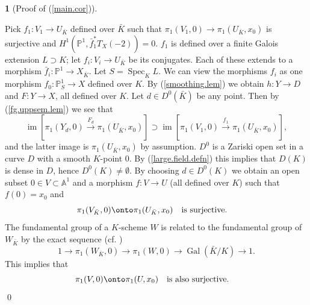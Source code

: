 \documentclass[12pt,twoside]{amsart}
\renewcommand{\a}[0]{{\mathbb A}}
\newcommand{\p}[0]{{\mathbb P}}
\newcommand{\qtq}[1]{\quad\mbox{#1}\quad}
\newcommand{\spec}[0]{\operatorname{Spec}}
\newcommand{\gal}[0]{\operatorname{Gal}}
\newcommand{\im}[0]{\operatorname{im}}
\theoremstyle{definition}
\newtheorem{say}[thm]{}
\theoremstyle{remark}
\begin{document}
\begin{say}[Proof of (\ref{main.cor})] {\ }

Pick $f_1:V_1\to U_{\bar K}$ defined over $\bar K$ such that
$\pi_1(V_1,0)\to \pi_1(U_{\bar K},x_0)$ is surjective
 and $H^1(\p^1, \bar f_1^*T_X(-2))=0$.
$f_1$ is defined over a finite Galois extension
$L\supset K$; let $f_i:V_i\to U_{\bar K}$ be its conjugates.
Each of these extends to a morphism $\bar f_i:\p^1\to X_{\bar K}$.
Let $S=\spec_KL$. We can view the morphisms $f_i$ as one morphism
$f_0:\p^1_S\to X$ defined over $K$. 
By (\ref{smoothing.lem}) we obtain  $h:Y\to D$
and $F:Y\to X$, all defined over $K$.
 Let $d\in D^0(\bar K)$ be any point. Then by 
(\ref{fg.uppsem.lem}) we see that
$$
\im[\pi_1(Y_d,0)\stackrel{F_d}{\to} \pi_1(U_{\bar K},x_0)]\supset
\im[\pi_1(V_1,0)\stackrel{f_1}{\to} \pi_1(U_{\bar K},x_0)],
$$
and the latter image is $\pi_1(U_{\bar K},x_0)$ by assumption.
$D^0$ is a Zariski open set in a curve $D$ with a smooth $K$-point
$0$. By (\ref{large.field.defn})
this implies that $D(K)$ is dense in $D$, hence $D^0(K)\neq \emptyset$.
By choosing $d\in D^0(K)$  we obtain an
 open
 subset $0\in V\subset \a^1$ and a morphism $f:V\to U$ 
 (all defined over $K$) such that $f(0)=x_0$ and
$$
\pi_1 (V_{\bar K},0)\onto \pi_1 (U_{\bar K},x_0)\qtq{is surjective.}
$$
The fundamental group of  a $K$-scheme $W$
is related to the fundamental group of   $W_{\bar K}$
by the exact sequence (cf. \cite[IX.6.1]{sga1})
$$
1\to \pi_1 (W_{\bar K},0)\to \pi_1 (W,0)\to \gal(\bar K/K)\to 1.
$$
This implies that
$$
\pi_1 (V,0)\onto \pi_1 (U,x_0)\qtq{is also surjective.}
$$
\qed
\end{say}
\end{document}
